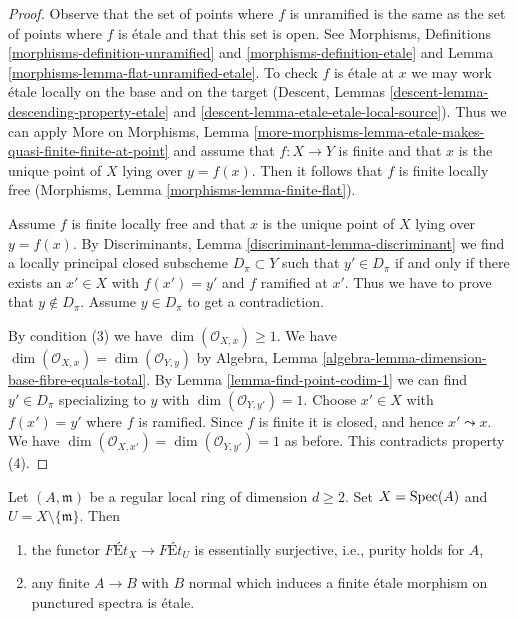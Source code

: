 \begin{proof}
Observe that the set of points where $f$ is unramified is the same as
the set of points where $f$ is \'etale and that this set is open.
See Morphisms, Definitions \ref{morphisms-definition-unramified}
and \ref{morphisms-definition-etale} and
Lemma \ref{morphisms-lemma-flat-unramified-etale}.
To check $f$ is \'etale at $x$ we may work \'etale
locally on the base and on the
target (Descent, Lemmas \ref{descent-lemma-descending-property-etale} and
\ref{descent-lemma-etale-etale-local-source}).
Thus we can apply More on Morphisms, Lemma
\ref{more-morphisms-lemma-etale-makes-quasi-finite-finite-at-point}
and assume that $f : X \to Y$ is finite and that $x$ is the unique
point of $X$ lying over $y = f(x)$.
Then it follows that $f$ is finite locally free
(Morphisms, Lemma \ref{morphisms-lemma-finite-flat}).

\medskip\noindent
Assume $f$ is finite locally free and that $x$ is the unique point of
$X$ lying over $y = f(x)$. By
Discriminants, Lemma \ref{discriminant-lemma-discriminant}
we find a locally principal closed subscheme $D_\pi \subset Y$
such that $y' \in D_\pi$ if and only if there exists an $x' \in X$
with $f(x') = y'$ and $f$ ramified at $x'$. Thus we have to prove
that $y \not \in D_\pi$. Assume $y \in D_\pi$ to get a contradiction.

\medskip\noindent
By condition (3) we have $\dim(\mathcal{O}_{X, x}) \geq 1$.
We have $\dim(\mathcal{O}_{X, x}) = \dim(\mathcal{O}_{Y, y})$ by
Algebra, Lemma \ref{algebra-lemma-dimension-base-fibre-equals-total}.
By Lemma \ref{lemma-find-point-codim-1}
we can find $y' \in D_\pi$ specializing to $y$
with $\dim(\mathcal{O}_{Y, y'}) = 1$.
Choose $x' \in X$ with $f(x') = y'$ where $f$ is ramified. Since $f$
is finite it is closed, and hence $x' \leadsto x$.
We have $\dim(\mathcal{O}_{X, x'}) = \dim(\mathcal{O}_{Y, y'}) = 1$
as before. This contradicts property (4).
\end{proof}

\begin{lemma}
\label{lemma-local-purity}
Let $(A, \mathfrak m)$ be a regular local ring of dimension $d \geq 2$.
Set $X = \mathop{\mathrm{Spec}}(A)$ and $U = X \setminus \{\mathfrak m\}$. Then
\begin{enumerate}
\item the functor $\textit{F\'Et}_X \to \textit{F\'Et}_U$
is essentially surjective, i.e., purity holds for $A$,
\item any finite $A \to B$ with $B$ normal which
induces a finite \'etale morphism on punctured spectra is \'etale.
\end{enumerate}
\end{lemma}

